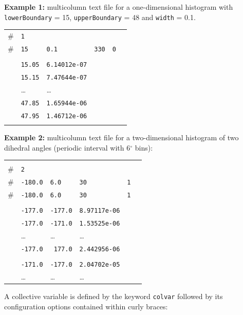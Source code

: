 \noindent\textbf{Example 1:} multicolumn text file for a one-dimensional histogram with \texttt{lowerBoundary} = 15, \texttt{upperBoundary} = 48 and \texttt{width} = 0.1.

\begin{tabular}{l l l l l l}
\\
\# & \texttt{1} & & & & \\
\# & \texttt{15} & \texttt{0.1} & \texttt{330} & \texttt{0} \\
\\
& \texttt{15.05} & \texttt{6.14012e-07} & & & \\
& \texttt{15.15} & \texttt{7.47644e-07} & & & \\
& \ldots & \ldots & & & \\
& \texttt{47.85} & \texttt{1.65944e-06} & & & \\
& \texttt{47.95} & \texttt{1.46712e-06} & & & \\
\\
\end{tabular}

\noindent\textbf{Example 2:} multicolumn text file for a two-dimensional histogram of two dihedral angles (periodic interval with 6$^\circ$ bins):

\begin{tabular}{l l l l l l}
& & & & \\
\# & \texttt{2} & & & & \\
\# & \texttt{-180.0} & \texttt{6.0} & \texttt{30} & \texttt{1} \\
\# & \texttt{-180.0} & \texttt{6.0} & \texttt{30} & \texttt{1} \\
\\
& \texttt{-177.0} & \texttt{-177.0} & \texttt{8.97117e-06} & & \\
& \texttt{-177.0} & \texttt{-171.0} & \texttt{1.53525e-06} & & \\
& \ldots & \ldots & \ldots & & \\
& \texttt{-177.0} & \texttt{ 177.0} & \texttt{2.442956-06} & & \\
\\
& \texttt{-171.0} & \texttt{-177.0} & \texttt{2.04702e-05} & & \\
& \ldots & \ldots & \ldots & & \\
\end{tabular}




A collective variable is defined by the keyword \texttt{colvar} followed by its configuration options contained within curly braces:

